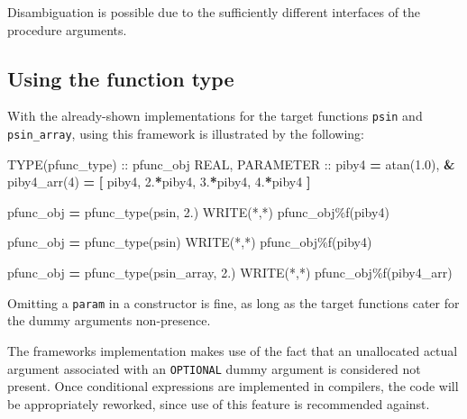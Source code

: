\documentclass[
]{scrartcl}
\newenvironment{Shaded}{}{}
\newcommand{\BuiltInTok}[1]{\textcolor[rgb]{0.00,0.50,0.00}{#1}}
\newcommand{\DataTypeTok}[1]{\textcolor[rgb]{0.56,0.13,0.00}{#1}}
\newcommand{\DecValTok}[1]{\textcolor[rgb]{0.25,0.63,0.44}{#1}}
\newcommand{\FloatTok}[1]{\textcolor[rgb]{0.25,0.63,0.44}{#1}}
\newcommand{\FunctionTok}[1]{\textcolor[rgb]{0.02,0.16,0.49}{#1}}
\newcommand{\KeywordTok}[1]{\textcolor[rgb]{0.00,0.44,0.13}{\textbf{#1}}}
\newcommand{\NormalTok}[1]{#1}
\newcommand{\OperatorTok}[1]{\textcolor[rgb]{0.40,0.40,0.40}{#1}}
\begin{document}
Disambiguation is possible due to the sufficiently different interfaces
of the procedure arguments.

\subsection{Using the function type}\label{using-the-function-type}

With the already-shown implementations for the target functions
\texttt{psin} and \texttt{psin\_array}, using this framework is
illustrated by the following:

\begin{Shaded}
\begin{Highlighting}[]
\DataTypeTok{TYPE(pfunc\_type)} \DataTypeTok{::}\NormalTok{ pfunc\_obj}
\DataTypeTok{REAL}\NormalTok{, }\DataTypeTok{PARAMETER} \DataTypeTok{::}\NormalTok{ piby4 }\KeywordTok{=} \BuiltInTok{atan}\NormalTok{(}\FloatTok{1.0}\NormalTok{), }\KeywordTok{\&}
\NormalTok{    piby4\_arr(}\DecValTok{4}\NormalTok{) }\KeywordTok{=} \KeywordTok{[}\NormalTok{ piby4, }\FloatTok{2.}\KeywordTok{*}\NormalTok{piby4, }\FloatTok{3.}\KeywordTok{*}\NormalTok{piby4, }\FloatTok{4.}\KeywordTok{*}\NormalTok{piby4 }\KeywordTok{]}

\NormalTok{pfunc\_obj }\KeywordTok{=}\NormalTok{ pfunc\_type(psin, }\FloatTok{2.}\NormalTok{)}
\FunctionTok{WRITE(*}\NormalTok{,}\FunctionTok{*)}\NormalTok{ pfunc\_obj}\OperatorTok{\%}\NormalTok{f(piby4)}

\NormalTok{pfunc\_obj }\KeywordTok{=}\NormalTok{ pfunc\_type(psin)}
\FunctionTok{WRITE(*}\NormalTok{,}\FunctionTok{*)}\NormalTok{ pfunc\_obj}\OperatorTok{\%}\NormalTok{f(piby4)}

\NormalTok{pfunc\_obj }\KeywordTok{=}\NormalTok{ pfunc\_type(psin\_array, }\FloatTok{2.}\NormalTok{)}
\FunctionTok{WRITE(*}\NormalTok{,}\FunctionTok{*)}\NormalTok{ pfunc\_obj}\OperatorTok{\%}\NormalTok{f(piby4\_arr)}
\end{Highlighting}
\end{Shaded}

Omitting a \texttt{param} in a constructor is fine, as long as the
target functions cater for the dummy argument\textquotesingle s
non-presence.

The framework\textquotesingle s implementation makes use of the fact
that an unallocated actual argument associated with an \texttt{OPTIONAL}
dummy argument is considered not present. Once conditional expressions
are implemented in compilers, the code will be appropriately reworked,
since use of this feature is recommended against.
\end{document}
